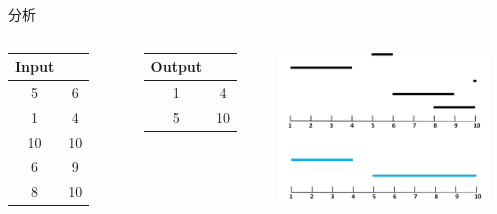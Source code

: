 \begin{frame}{分析}
    \begin{columns}
            \begin{table}
                \begin{tabular}{cc}
                Input \\\hline
                5  & 6 \\\hline
				1  & 4  \\\hline
				10 & 10 \\\hline
				6  & 9  \\\hline
				8  & 10  \\\hline
                \end{tabular}
            \end{table}
            \begin{table}
                \begin{tabular}{cc}
                Output \\\hline
				1  & 4  \\\hline
				5 & 10 \\\hline
                \end{tabular}
            \end{table}
            \includegraphics[width=0.9\textwidth]{fig/5-2.png}
    \end{columns}
\end{frame}
